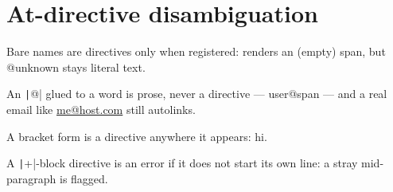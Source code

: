 \section{At-directive disambiguation}

Bare names are directives only when registered:  renders an (empty) span,
but @unknown stays literal text.

An \texttt|@| glued to a word is prose, never a directive — user@span — and a real
email like \href{mailto:me@host.com}{me@host.com} still autolinks.

A bracket form is a directive anywhere it appears: hi.

A \texttt|+|-block directive is an error if it does not start its own line:
a stray  mid-paragraph is flagged.

